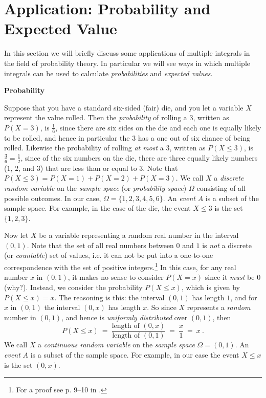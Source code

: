 \section{Application: Probability and Expected Value}
In this section we will briefly discuss some applications of multiple integrals in the field of
probability theory. In particular we will see ways in which multiple integrals can be used to calculate
\emph{probabilities} and \emph{expected values}.\vspace{4mm}

\par\noindent\textbf{\large{Probability}}\normalsize\vspace{2mm}

Suppose that you have a standard six-sided (fair) die, and you let a variable $X$ represent the value rolled. Then the
\emph{probability} of rolling a $3$, written as $P(X=3)$, is $\frac{1}{6}$, since there are six sides on the die and
each one is equally likely to be rolled, and hence in particular the $3$ has a one out of six chance of being rolled.
Likewise the probability of rolling \emph{at most} a $3$, written as $P(X \le 3)$, is $\frac{3}{6} = \frac{1}{2}$,
since of the six numbers on the die, there are three equally likely numbers ($1$, $2$, and $3$) that are less than or
equal to $3$. Note that $P(X \le 3) = P(X=1) + P(X=2) + P(X=3)$. We call $X$ a \emph{discrete random variable} on the
\emph{sample space} (or \emph{probability space}) $\Omega$ consisting of all possible outcomes. In our case,
$\Omega = \lbrace 1,2,3,4,5,6 \rbrace$.
An \emph{event} $A$ is a subset of the sample space. For example, in the case of the die, the event $X \le 3$ is the set
$\lbrace 1,2,3 \rbrace$.

Now let $X$ be a variable representing a random real number in the interval $(0,1)$. Note that the set of all real
numbers between $0$ and $1$ is \emph{not} a discrete (or \emph{countable}) set of values, i.e. it can not be put into a
one-to-one correspondence with the set of positive integers.\footnote{For a proof see p. 9--10 in .}
In this case, for any real number
$x$ in $(0,1)$, it makes no sense to consider $P(X=x)$ since it \emph{must} be $0$ (why?). Instead, we consider the
probability $P(X \le x)$, which is given by $P(X \le x) = x$. The reasoning is this: the interval $(0,1)$ has length $1$,
and for $x$ in $(0,1)$ the interval $(0,x)$ has length $x$. So since $X$ represents a \emph{random} number in $(0,1)$,
and hence is \emph{uniformly distributed} over $(0,1)$, then
\begin{displaymath}
 P(X \le x) ~=~ \frac{\text{length of $(0,x)$}}{\text{length of $(0,1)$}} ~=~ \frac{x}{1} ~=~ x ~.
\end{displaymath}
We call $X$ a \emph{continuous random variable} on the \emph{sample space} $\Omega = (0,1)$. An \emph{event} $A$ is a
subset of the sample space. For example, in our case the event $X \le x$ is the set $(0,x)$.

